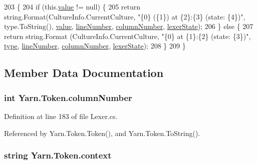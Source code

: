 \begin{DoxyCode}
203                                           \{
204             \textcolor{keywordflow}{if} (this.\hyperlink{a00175_a3df6b32d6190a639619a3f064c2154e2}{value} != null) \{
205                 \textcolor{keywordflow}{return} string.Format(CultureInfo.CurrentCulture, \textcolor{stringliteral}{"\{0\} (\{1\}) at \{2\}:\{3\} (state: \{4\})"}, 
      type.ToString(), \hyperlink{a00175_a3df6b32d6190a639619a3f064c2154e2}{value}, \hyperlink{a00175_a80fe710713201bb793a41452e314a721}{lineNumber}, \hyperlink{a00175_a9a0f0a8a7ab1e90ab48f15192323ffca}{columnNumber}, 
      \hyperlink{a00175_a710099e7abe84f30864a320cc7464214}{lexerState});
206             \} \textcolor{keywordflow}{else} \{
207                 \textcolor{keywordflow}{return} string.Format (CultureInfo.CurrentCulture, \textcolor{stringliteral}{"\{0\} at \{1\}:\{2\} (state: \{3\})"}, 
      \hyperlink{a00175_a471a25da67fda0524f2375f9a882aafa}{type}, \hyperlink{a00175_a80fe710713201bb793a41452e314a721}{lineNumber}, \hyperlink{a00175_a9a0f0a8a7ab1e90ab48f15192323ffca}{columnNumber}, \hyperlink{a00175_a710099e7abe84f30864a320cc7464214}{lexerState});
208             \}
209         \}
\end{DoxyCode}


\subsection{Member Data Documentation}
\hypertarget{a00175_a9a0f0a8a7ab1e90ab48f15192323ffca}{
\subsubsection[{column\-Number}]{\setlength{\rightskip}{0pt plus 5cm}int Yarn.\-Token.\-column\-Number}}\label{a00175_a9a0f0a8a7ab1e90ab48f15192323ffca}


Definition at line 183 of file Lexer.\-cs.



Referenced by Yarn.\-Token.\-Token(), and Yarn.\-Token.\-To\-String().

\hypertarget{a00175_a089d248c904a6e8366b81c2c47ff5af8}{
\subsubsection[{context}]{\setlength{\rightskip}{0pt plus 5cm}string Yarn.\-Token.\-context}}\label{a00175_a089d248c904a6e8366b81c2c47ff5af8}


